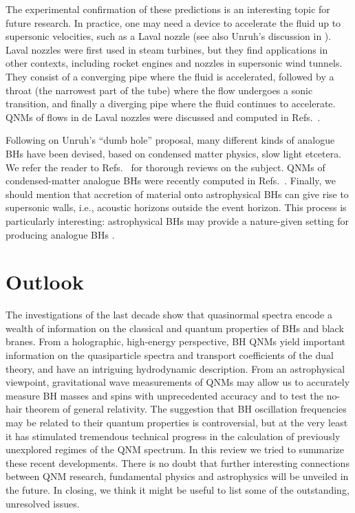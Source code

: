 \documentclass[]{iopart}
\begin{document}
The experimental confirmation of these predictions is an interesting topic for
future research.
In practice, one may need a device to accelerate the fluid up to supersonic
velocities, such as a Laval nozzle \cite{Cardoso:2005ij,Cadoni:2005nh} (see
also Unruh's discussion in \cite{novellovisser}). Laval nozzles were first
used in steam turbines, but they find applications in other contexts,
including rocket engines and nozzles in supersonic wind tunnels. They consist
of a converging pipe where the fluid is accelerated, followed by a throat (the
narrowest part of the tube) where the flow undergoes a sonic transition, and
finally a diverging pipe where the fluid continues to accelerate.  QNMs of
flows in de Laval nozzles were discussed and computed in
Refs.~\cite{Okuzumi:2007hf,Abdalla:2007dz}.

Following on Unruh's ``dumb hole'' proposal, many different kinds of analogue
BHs have been devised, based on condensed matter physics, slow light
etcetera. We refer the reader to Refs.~\cite{novellovisser,Barcelo:2005fc} for
thorough reviews on the subject.  QNMs of condensed-matter analogue BHs were
recently computed in Refs.~\cite{Nakano:2004ha,Barcelo:2007ru}.  Finally, we
should mention that accretion of material onto astrophysical BHs can give rise
to supersonic walls, i.e., acoustic horizons outside the event horizon.  This
process is particularly interesting: astrophysical BHs may provide a
nature-given setting for producing analogue BHs \cite{Das:2006an,Das:2007ix}.

\section{Outlook}

The investigations of the last decade show that quasinormal spectra encode a
wealth of information on the classical and quantum properties of BHs and black
branes. From a holographic, high-energy perspective, BH QNMs yield important
information on the quasiparticle spectra and transport coefficients of the
dual theory, and have an intriguing hydrodynamic description. From an
astrophysical viewpoint, gravitational wave measurements of QNMs may allow us
to accurately measure BH masses and spins with unprecedented accuracy and to
test the no-hair theorem of general relativity. The suggestion that BH
oscillation frequencies may be related to their quantum properties is
controversial, but at the very least it has stimulated tremendous technical
progress in the calculation of previously unexplored regimes of the QNM
spectrum. In this review we tried to summarize these recent
developments. There is no doubt that further interesting connections between
QNM research, fundamental physics and astrophysics will be unveiled in the
future. In closing, we think it might be useful to list some of the
outstanding, unresolved issues.
\end{document}
